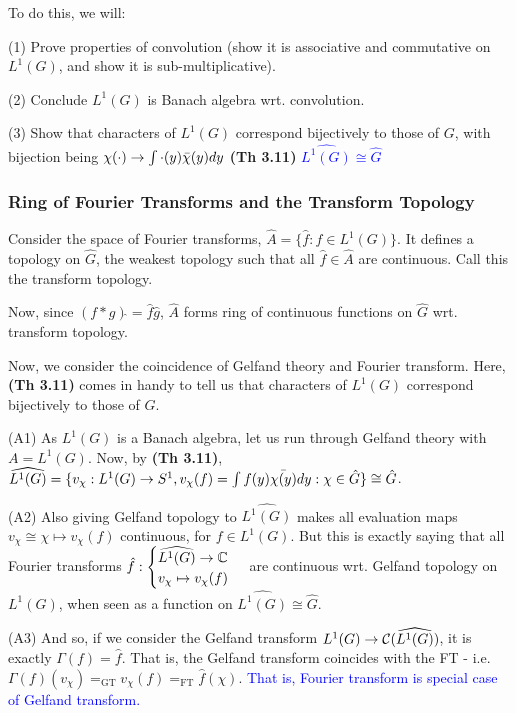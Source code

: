 \documentclass{article}
\begin{document}
To do this, we will:

(1) Prove properties of convolution (show it is associative and commutative on $L^1(G)$, and show it is sub-multiplicative).

(2) Conclude $L^1(G)$ is Banach algebra wrt. convolution. 

(3) Show that characters of $L^1(G)$ correspond bijectively to those of $G$, with bijection being $\chi(\cdot) \rightarrow \int \cdot(y) \bar{\chi}(y) dy$ \textbf{(Th 3.11)} \textcolor{blue}{$\widehat{L^1(G)} \cong \hat{G} $}

\subsubsection{Ring of Fourier Transforms and the Transform Topology}

Consider the space of Fourier transforms, $\hat{A} = \{\hat{f}: f \in L^1(G) \}$. It defines a topology on $\hat{G}$, the weakest topology such that all $\hat{f} \in \hat{A}$ are continuous. Call this the transform topology.

Now, since $(f * g)\hat{} = \hat{f} \hat{g}$, $\hat{A}$ forms ring of continuous functions on $\hat{G}$ wrt. transform topology. 

Now, we consider the coincidence of Gelfand theory and Fourier transform. Here, \textbf{(Th 3.11)} comes in handy to tell us that characters of $L^1(G)$ correspond bijectively to those of $G$.

(A1) As $L^1(G)$ is a Banach algebra, let us run through Gelfand theory with $A = L^1(G)$. Now, by \textbf{(Th 3.11)}, $\widehat{L^1(G)} = \{v_{\chi}: L^1(G) \rightarrow S^1, v_{\chi}(f) = \int f(y) \bar{\chi(y)}dy: \chi \in \hat{G} \} \cong \hat{G}$.

(A2) Also giving Gelfand topology to $\widehat{L^1(G)}$ makes all evaluation maps $v_{\chi} \cong \chi \mapsto v_{\chi}(f)$ continuous, for $f \in L^1(G)$. But this is exactly saying that all Fourier transforms $\hat{f}:\begin{cases}
    \widehat{L^1(G)} \rightarrow \mathbb{C} \\
    v_{\chi} \mapsto v_{\chi}(f)
\end{cases}$ are continuous wrt. Gelfand topology on $L^1(G)$, when seen as a function on $\widehat{L^1(G)} \cong \hat{G}$.

(A3) And so, if we consider the Gelfand transform $L^1(G) \rightarrow \mathcal{C}(\widehat{L^1(G)})$, it is exactly $\Gamma(f) = \hat{f}$. That is, the Gelfand transform coincides with the FT - i.e. $\Gamma(f)(v_{\chi}) =_{\text{GT}} {v}_\chi(f)=_{\text{FT}} \hat{f}(\chi) $. \textcolor{blue}{That is, Fourier transform is special case of Gelfand transform.}
\end{document}
